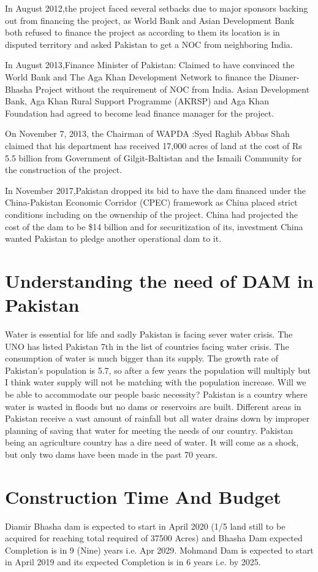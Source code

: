\documentclass[11pt, journal,letterpaper,compsoc]{IEEEtran}
\begin{document}
In August 2012,the project faced several setbacks due to major sponsors backing out from financing the project, as World Bank and Asian Development Bank both refused to finance the project as according to them its location is in disputed territory and asked Pakistan to get
 a NOC from neighboring India.
\hfill  

In August 2013,Finance Minister of Pakistan: Claimed to have convinced the World Bank and The Aga Khan Development Network to finance the Diamer-Bhasha Project without the requirement of NOC from India. Asian Development Bank, Aga Khan Rural Support Programme
 (AKRSP) and Aga Khan Foundation had agreed to become lead finance manager for the project.
\hfill  

On November 7, 2013, the Chairman of WAPDA :Syed Raghib Abbas Shah claimed that his department has received 17,000 acres of land at the cost of Rs 5.5 billion from Government of Gilgit-Baltistan and the Ismaili Community for the construction of the project.
\hfill 
 
In November 2017,Pakistan dropped its bid to have the dam financed under the China-Pakistan Economic Corridor (CPEC) framework as China placed strict conditions including on the ownership of the project. China had projected the cost of the dam to be \$14 billion and for
securitization of its, investment China wanted Pakistan to pledge another operational dam to it.
\hfill 


\section{Understanding the need of DAM in Pakistan}
Water is essential for life and sadly Pakistan is facing sever water crisis. The UNO has listed Pakistan 7th in the list of countries facing water crisis. The consumption of water is much bigger than its supply. The growth rate of Pakistan’s population is 5.7, so after a few years the population will multiply but I think water supply will not be matching with the population increase. Will we be able to accommodate our people basic necessity?
Pakistan is a country where water is wasted in floods but no dams or reservoirs are built. Different areas in Pakistan receive a vast amount of rainfall but all water drains down by improper planning of saving that water for meeting the needs of our country. Pakistan being an agriculture country has a dire need of water. It will come as a shock, but only two dams have been made in the past 70 years.

 
 \section{Construction Time And Budget}
Diamir Bhasha dam is expected to start in April 2020 (1/5 land still to be acquired for reaching total required of 37500 Acres) and Bhasha Dam expected Completion is in 9 (Nine) years i.e. Apr 2029.
Mohmand Dam is expected to start in April 2019 and its expected Completion is in 6 years i.e. by 2025.
\end{document}
